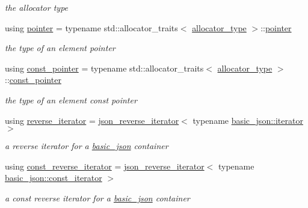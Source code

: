 \begin{DoxyCompactItemize}
\begin{DoxyCompactList}\small\item\em the allocator type \end{DoxyCompactList}\item 
using \hyperlink{classnlohmann_1_1basic__json_a9d1b58099dc64695fcf2847ab0b2a7c7}{pointer} = typename std\-::allocator\-\_\-traits$<$ \hyperlink{classnlohmann_1_1basic__json_aa44ce84b9ac506b905b8fb56c9a0989d}{allocator\-\_\-type} $>$\-::\hyperlink{classnlohmann_1_1basic__json_a9d1b58099dc64695fcf2847ab0b2a7c7}{pointer}
\begin{DoxyCompactList}\small\item\em the type of an element pointer \end{DoxyCompactList}\item 
using \hyperlink{classnlohmann_1_1basic__json_a06efb200b69942eacd1ea22d0f6ccebb}{const\-\_\-pointer} = typename std\-::allocator\-\_\-traits$<$ \hyperlink{classnlohmann_1_1basic__json_aa44ce84b9ac506b905b8fb56c9a0989d}{allocator\-\_\-type} $>$\-::\hyperlink{classnlohmann_1_1basic__json_a06efb200b69942eacd1ea22d0f6ccebb}{const\-\_\-pointer}
\begin{DoxyCompactList}\small\item\em the type of an element const pointer \end{DoxyCompactList}\item 
using \hyperlink{classnlohmann_1_1basic__json_a2f1f83aa187a56dc5ec7a7027065ac8a}{reverse\-\_\-iterator} = \hyperlink{classnlohmann_1_1basic__json_1_1json__reverse__iterator}{json\-\_\-reverse\-\_\-iterator}$<$ typename \hyperlink{classnlohmann_1_1basic__json_1_1iterator}{basic\-\_\-json\-::iterator} $>$
\begin{DoxyCompactList}\small\item\em a reverse iterator for a \hyperlink{classnlohmann_1_1basic__json}{basic\-\_\-json} container \end{DoxyCompactList}\item 
using \hyperlink{classnlohmann_1_1basic__json_ae336fff01f4b78e3e16e5008dc8dbc00}{const\-\_\-reverse\-\_\-iterator} = \hyperlink{classnlohmann_1_1basic__json_1_1json__reverse__iterator}{json\-\_\-reverse\-\_\-iterator}$<$ typename \hyperlink{classnlohmann_1_1basic__json_1_1const__iterator}{basic\-\_\-json\-::const\-\_\-iterator} $>$
\begin{DoxyCompactList}\small\item\em a const reverse iterator for a \hyperlink{classnlohmann_1_1basic__json}{basic\-\_\-json} container \end{DoxyCompactList}\item 

\end{DoxyCompactItemize}
